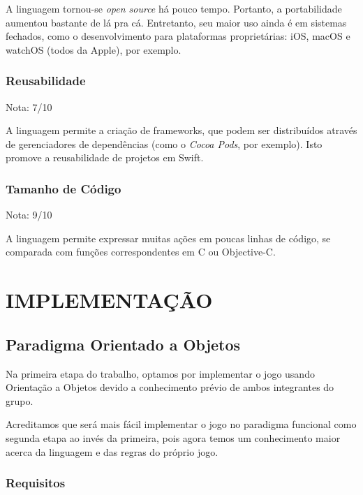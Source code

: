 \documentclass[rel_mlp]{iiufrgs}
\begin{document}
A linguagem tornou-se \textit{open source} há pouco tempo. Portanto, a portabilidade aumentou bastante de lá pra cá. Entretanto, seu maior uso ainda é em sistemas fechados, como o desenvolvimento para plataformas proprietárias: iOS, macOS e watchOS (todos da Apple), por exemplo.

\subsection{Reusabilidade}

Nota: 7/10

A linguagem permite a criação de frameworks, que podem ser distribuídos através de gerenciadores de dependências (como o \textit{Cocoa Pods}, por exemplo). Isto promove a reusabilidade de projetos em Swift.

\subsection{Tamanho de Código}

Nota: 9/10

A linguagem permite expressar muitas ações em poucas linhas de código, se comparada com funções correspondentes em C ou Objective-C.




\chapter{IMPLEMENTAÇÃO} \label{intro}

\section{Paradigma Orientado a Objetos} \label{intro}

Na primeira etapa do trabalho, optamos por implementar o jogo usando Orientação a Objetos devido a conhecimento prévio de ambos integrantes do grupo.

Acreditamos que será mais fácil implementar o jogo no paradigma funcional como segunda etapa ao invés da primeira, pois agora temos um conhecimento maior acerca da linguagem e das regras do próprio jogo.

\subsection{Requisitos}
\end{document}
